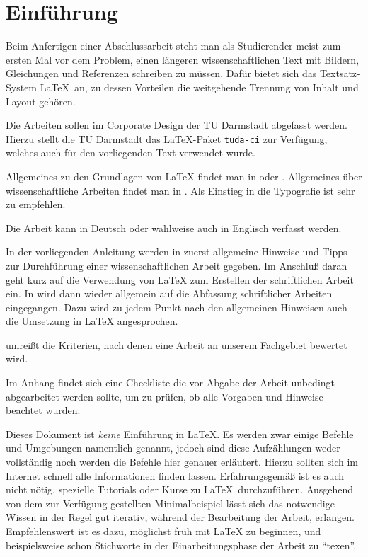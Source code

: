 \chapter{Einführung}
\label{cha:Intro}

Beim Anfertigen einer Abschlussarbeit steht man als Studierender meist zum ersten Mal vor dem Problem, einen längeren wissenschaftlichen Text mit Bildern, Gleichungen und Referenzen schreiben zu müssen.
Dafür bietet sich das Textsatz-System \LaTeX\ an, zu dessen Vorteilen die weitgehende Trennung von Inhalt und Layout gehören.

Die Arbeiten sollen im Corporate Design der TU Darmstadt abgefasst werden.
Hierzu stellt die TU Darmstadt das \LaTeX-Paket \verb|tuda-ci| zur Verfügung, welches auch für den vorliegenden Text verwendet wurde.


Allgemeines zu den Grundlagen von \LaTeX{} findet man \zB in \cite{Kopka} oder \cite{Schmidt}.
Allgemeines über wissenschaftliche Arbeiten findet man in \cite{Friedrich}.
Als Einstieg in die Typografie ist \cite{Willberg} sehr zu empfehlen.

Die Arbeit kann in Deutsch oder wahlweise auch in Englisch verfasst werden.

In der vorliegenden Anleitung werden in  zuerst allgemeine Hinweise und Tipps zur Durchführung einer wissenschaftlichen Arbeit gegeben.
Im Anschluß daran geht  kurz auf die Verwendung von \LaTeX{} zum Erstellen der schriftlichen Arbeit ein.
In  wird dann wieder allgemein auf die Abfassung schriftlicher Arbeiten eingegangen.
Dazu wird zu jedem Punkt nach den allgemeinen Hinweisen auch die Umsetzung in \LaTeX{} angesprochen.

 umreißt die Kriterien, nach denen eine Arbeit an unserem Fachgebiet bewertet wird.

Im Anhang findet sich eine Checkliste die vor Abgabe der Arbeit unbedingt abgearbeitet werden sollte, um zu prüfen, ob alle Vorgaben und Hinweise beachtet wurden.

Dieses Dokument ist \emph{keine} Einführung in \LaTeX{}.
Es werden zwar einige Befehle und Umgebungen namentlich genannt, jedoch sind diese Aufzählungen weder vollständig noch werden die Befehle hier genauer erläutert.
Hierzu sollten sich im Internet schnell alle Informationen finden lassen.
Erfahrungsgemäß ist es auch nicht nötig, spezielle Tutorials oder Kurse zu \LaTeX\ durchzuführen.
Ausgehend von dem zur Verfügung gestellten Minimalbeispiel lässt sich das notwendige Wissen in der Regel gut iterativ, während der Bearbeitung der Arbeit, erlangen.
Empfehlenswert ist es dazu, möglichst früh mit \LaTeX{} zu beginnen, und beispielsweise schon Stichworte in der Einarbeitungsphase der Arbeit zu "`texen"'.
